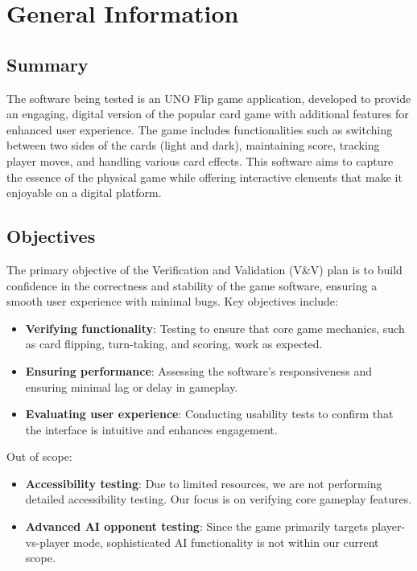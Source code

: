 \documentclass[12pt]{article}
\begin{document}
\section{General Information}

\subsection{Summary}
The software being tested is an UNO Flip game application, developed to provide an engaging, digital version of the popular card game with additional features for enhanced user experience. The game includes functionalities such as switching between two sides of the cards (light and dark), maintaining score, tracking player moves, and handling various card effects. This software aims to capture the essence of the physical game while offering interactive elements that make it enjoyable on a digital platform.

\subsection{Objectives}
The primary objective of the Verification and Validation (V\&V) plan is to build confidence in the correctness and stability of the game software, ensuring a smooth user experience with minimal bugs. Key objectives include:

\begin{itemize}
    \item \textbf{Verifying functionality}: Testing to ensure that core game mechanics, such as card flipping, turn-taking, and scoring, work as expected.
    \item \textbf{Ensuring performance}: Assessing the software’s responsiveness and ensuring minimal lag or delay in gameplay.
    \item \textbf{Evaluating user experience}: Conducting usability tests to confirm that the interface is intuitive and enhances engagement.
\end{itemize}

Out of scope:

\begin{itemize}
    \item \textbf{Accessibility testing}: Due to limited resources, we are not performing detailed accessibility testing. Our focus is on verifying core gameplay features.
    \item \textbf{Advanced AI opponent testing}: Since the game primarily targets player-vs-player mode, sophisticated AI functionality is not within our current scope.
\end{itemize}
\end{document}
